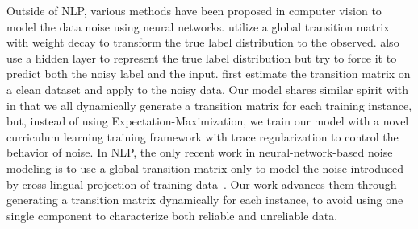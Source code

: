 
Outside of NLP, various methods have been proposed in computer vision  to 
 model the data noise using neural networks.
\cite{sukhbaatar2014training}  utilize a global transition matrix with weight decay to transform the true label distribution to 
the observed.  %
\cite{reed2014training} also use a hidden layer to represent the true label distribution but try to force it to predict both the noisy label and the input. \cite{chen2015webly,xiao2015learning} first estimate the transition matrix on a clean dataset and apply to the noisy data. 
Our model shares similar spirit with \cite{misra2016seeing} in that we all dynamically generate a transition matrix for each
training instance, but, instead of using Expectation-Maximization, we train our model with a novel curriculum learning training framework with trace regularization to control the behavior of noise.
In NLP, the only recent work in neural-network-based noise modeling is to use a global transition matrix only to model the noise introduced by
cross-lingual projection of training data~\cite{fang2016learning}.
 Our work advances them through generating a transition matrix dynamically for each instance, to avoid  using one single component to characterize both reliable and unreliable data. 



